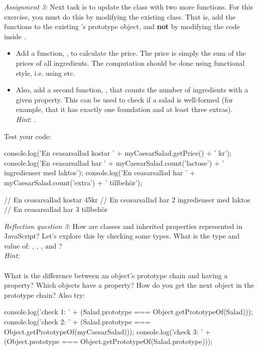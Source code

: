 \documentclass[fleqn, article, a4paper]{memoir}
\begin{document}
\begin{Assignments}
\item \emph{Assignment 3:} Next task is to update the  class with two more functions. For this exercise, you must do this by modifying the existing class. That is, add the functions to the existing 's prototype object, and \textbf{not} by modifying the code inside .

\begin{itemize}
  \item Add a function, , to calculate the price. The price is simply the sum of the prices of all ingredients. The computation should be done using functional style, i.e. using  etc. 
  
  \item Also, add a second function, , that counts the number of ingredients with a given property. This can be used to check if a salad is well-formed (for example, that it has exactly one foundation and at least three extras).\\
  \emph{Hint}: .
\end{itemize}

\noindent Test your code:
\begin{Code}
console.log('En ceasarsallad kostar ' + myCaesarSalad.getPrice() + ' kr');
console.log('En ceasarsallad har ' + myCaesarSalad.count('lactose') + 
            ' ingredienser med laktos');
console.log('En ceasarsallad har ' + myCaesarSalad.count('extra') + ' tillbehör');

// En ceasarsallad kostar 45kr
// En ceasarsallad har 2 ingredienser med laktos
// En ceasarsallad har 3 tillbehör
\end{Code}
\emph{Reflection question 3:} How are classes and inherited properties represented in JavaScript? Let's explore this by checking some types. What is the type and value of: , , ,  and ?
\\ \emph{Hint:} 
\\\\
What is the difference between an object's prototype chain and having a  property? Which objects have a  property? How do you get the next object in the prototype chain? Also try:
\begin{Code}
console.log('check 1: ' + 
  (Salad.prototype === Object.getPrototypeOf(Salad)));
console.log('check 2: ' + 
  (Salad.prototype === Object.getPrototypeOf(myCaesarSalad)));
console.log('check 3: ' + 
  (Object.prototype === Object.getPrototypeOf(Salad.prototype)));
 \end{Code}


\end{Assignments}
\end{document}

